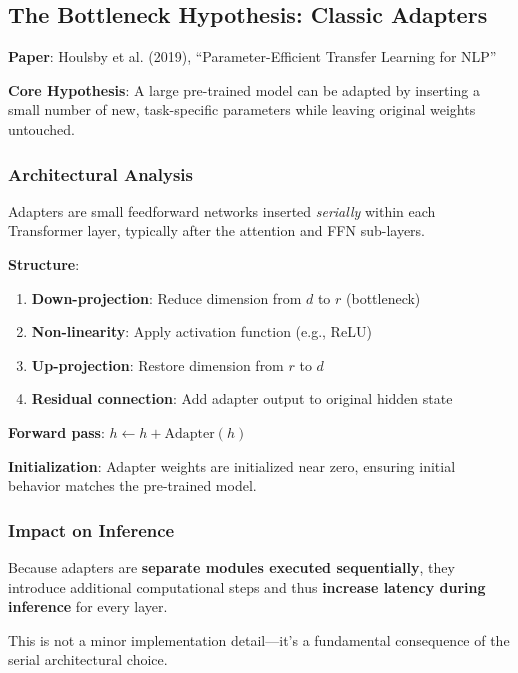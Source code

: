 \documentclass{article}
\begin{document}
\subsection{The Bottleneck Hypothesis: Classic Adapters}

\textbf{Paper}: Houlsby et al. (2019), ``Parameter-Efficient Transfer Learning for NLP''

\textbf{Core Hypothesis}: A large pre-trained model can be adapted by inserting a small number of new, task-specific parameters while leaving original weights untouched.

\subsubsection{Architectural Analysis}

Adapters are small feedforward networks inserted \textit{serially} within each Transformer layer, typically after the attention and FFN sub-layers.

\textbf{Structure}:
\begin{enumerate}
\item \textbf{Down-projection}: Reduce dimension from $d$ to $r$ (bottleneck)
\item \textbf{Non-linearity}: Apply activation function (e.g., ReLU)
\item \textbf{Up-projection}: Restore dimension from $r$ to $d$
\item \textbf{Residual connection}: Add adapter output to original hidden state
\end{enumerate}

\begin{center}
\end{center}

\textbf{Forward pass}: $h \leftarrow h + \text{Adapter}(h)$

\textbf{Initialization}: Adapter weights are initialized near zero, ensuring initial behavior matches the pre-trained model.

\subsubsection{Impact on Inference}

\begin{tcolorbox}[colback=yellow!5!white, colframe=orange!50!black, title=Critical Trade-off: Serial Architecture]
Because adapters are \textbf{separate modules executed sequentially}, they introduce additional computational steps and thus \textbf{increase latency during inference} for every layer.

This is not a minor implementation detail---it's a fundamental consequence of the serial architectural choice.
\end{tcolorbox}
\end{document}
